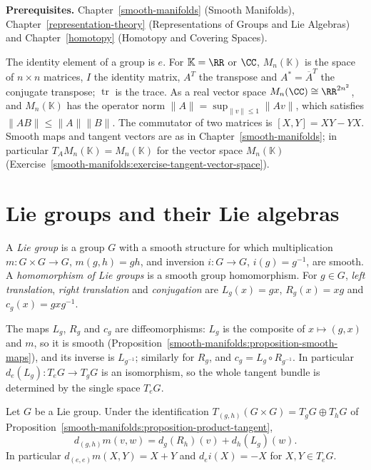 \noindent\textbf{Prerequisites.} Chapter~\ref{smooth-manifolds} (Smooth Manifolds), Chapter~\ref{representation-theory} (Representations of Groups and Lie Algebras) and
Chapter~\ref{homotopy} (Homotopy and Covering Spaces).

\begin{notation}\label{lie-groups:notation-matrices}
The identity element of a group is $e$. For $\mathbb{K} = \RR$ or $\CC$, $M_n(\mathbb{K})$ is the space of $n \times n$ matrices, $I$ the identity matrix, $A^T$
the transpose and $A^* = \overline{A}^T$ the conjugate transpose; $\operatorname{tr}$ is the trace. As a real vector space $M_n(\CC) \cong \RR^{2n^2}$, and
$M_n(\mathbb{K})$ has the operator norm $\|A\| = \sup_{\|v\| \leq 1}\|Av\|$, which satisfies $\|AB\| \leq \|A\|\|B\|$. The commutator of two matrices is
$[X, Y] = XY - YX$. Smooth maps and tangent vectors are as in Chapter~\ref{smooth-manifolds}; in particular $T_A M_n(\mathbb{K}) = M_n(\mathbb{K})$ for the
vector space $M_n(\mathbb{K})$ (Exercise~\ref{smooth-manifolds:exercise-tangent-vector-space}).
\end{notation}

\section{Lie groups and their Lie algebras}\label{lie-groups:section-lie-algebras}

\begin{definition}\label{lie-groups:definition-lie-group}
A \emph{Lie group} is a group $G$ with a smooth structure for which multiplication $m \colon G \times G \to G$, $m(g, h) = gh$, and inversion
$i \colon G \to G$, $i(g) = g^{-1}$, are smooth. A \emph{homomorphism of Lie groups} is a smooth group homomorphism. For $g \in G$, \emph{left translation},
\emph{right translation} and \emph{conjugation} are $L_g(x) = gx$, $R_g(x) = xg$ and $c_g(x) = gxg^{-1}$.
\end{definition}

The maps $L_g$, $R_g$ and $c_g$ are diffeomorphisms: $L_g$ is the composite of $x \mapsto (g, x)$ and $m$, so it is smooth
(Proposition~\ref{smooth-manifolds:proposition-smooth-maps}), and its inverse is $L_{g^{-1}}$; similarly for $R_g$, and $c_g = L_g \circ R_{g^{-1}}$. In
particular $d_e(L_g) \colon T_eG \to T_gG$ is an isomorphism, so the whole tangent bundle is determined by the single space $T_eG$.

\begin{lemma}\label{lie-groups:lemma-differential-multiplication}
Let $G$ be a Lie group. Under the identification $T_{(g,h)}(G \times G) = T_gG \oplus T_hG$ of
Proposition~\ref{smooth-manifolds:proposition-product-tangent},
\[
d_{(g,h)}m(v, w) = d_g(R_h)(v) + d_h(L_g)(w).
\]
In particular $d_{(e,e)}m(X, Y) = X + Y$ and $d_ei(X) = -X$ for $X, Y \in T_eG$.
\end{lemma}

